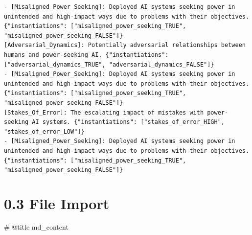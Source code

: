 \documentclass[
  11pt,
  letterpaper,
]{book}
\newenvironment{Shaded}{\begin{snugshade}}{\end{snugshade}}
\newcommand{\CommentTok}[1]{\textcolor[rgb]{0.37,0.37,0.37}{#1}}
\newcommand{\NormalTok}[1]{\textcolor[rgb]{0.00,0.23,0.31}{#1}}
\begin{document}
\begin{verbatim}
- [Misaligned_Power_Seeking]: Deployed AI systems seeking power in unintended and high-impact ways due to problems with their objectives. {"instantiations": ["misaligned_power_seeking_TRUE", "misaligned_power_seeking_FALSE"]}
[Adversarial_Dynamics]: Potentially adversarial relationships between humans and power-seeking AI. {"instantiations": ["adversarial_dynamics_TRUE", "adversarial_dynamics_FALSE"]}
- [Misaligned_Power_Seeking]: Deployed AI systems seeking power in unintended and high-impact ways due to problems with their objectives. {"instantiations": ["misaligned_power_seeking_TRUE", "misaligned_power_seeking_FALSE"]}
[Stakes_Of_Error]: The escalating impact of mistakes with power-seeking AI systems. {"instantiations": ["stakes_of_error_HIGH", "stakes_of_error_LOW"]}
- [Misaligned_Power_Seeking]: Deployed AI systems seeking power in unintended and high-impact ways due to problems with their objectives. {"instantiations": ["misaligned_power_seeking_TRUE", "misaligned_power_seeking_FALSE"]}
\end{verbatim}

\section{0.3 File Import}\label{file-import}

\begin{Shaded}
\begin{Highlighting}[]
\CommentTok{\# @title}
\NormalTok{md\_content}
\end{Highlighting}
\end{Shaded}
\end{document}
